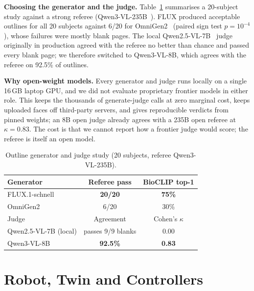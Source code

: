 \documentclass[conference]{IEEEtran}
\begin{document}
\textbf{Choosing the generator and the judge.} Table~\ref{tab:judge} summarises a 20-subject study against a
strong referee (Qwen3-VL-235B~\cite{bai2025qwen3vl}). FLUX produced acceptable outlines for all 20 subjects against
6/20 for OmniGen2~\cite{wu2025omnigen2} (paired sign test $p=10^{-4}$), whose failures were mostly blank pages. The local Qwen2.5-VL-7B~\cite{bai2025qwen25vl} judge originally
in production agreed with the referee no better than chance and passed every blank page; we therefore switched
to Qwen3-VL-8B, which agrees with the referee on 92.5\% of outlines.

\textbf{Why open-weight models.} Every generator and judge runs locally on a single 16\,GB laptop GPU, and we did
not evaluate proprietary frontier models in either role. This keeps the thousands of generate-judge calls at zero
marginal cost, keeps uploaded faces off third-party servers, and gives reproducible verdicts from pinned weights;
an 8B open judge already agrees with a 235B open referee at $\kappa=0.83$. The cost is that we cannot report how
a frontier judge would score; the referee is itself an open model.

\begin{table}[t]
\centering
\caption{Outline generator and judge study (20 subjects, referee Qwen3-VL-235B).}
\label{tab:judge}
\setlength{\tabcolsep}{4pt}
\begin{tabular}{lcc}
\toprule
Generator & Referee pass & BioCLIP top-1 \\
\midrule
FLUX.1-schnell & \textbf{20/20} & \textbf{75\%} \\
OmniGen2       & 6/20  & 30\% \\
\midrule
Judge & Agreement & Cohen's $\kappa$ \\
\midrule
Qwen2.5-VL-7B (local) & passes 9/9 blanks & 0.00 \\
Qwen3-VL-8B           & \textbf{92.5\%}   & \textbf{0.83} \\
\bottomrule
\end{tabular}
\end{table}

\section{Robot, Twin and Controllers}
\label{sec:control}
\end{document}
